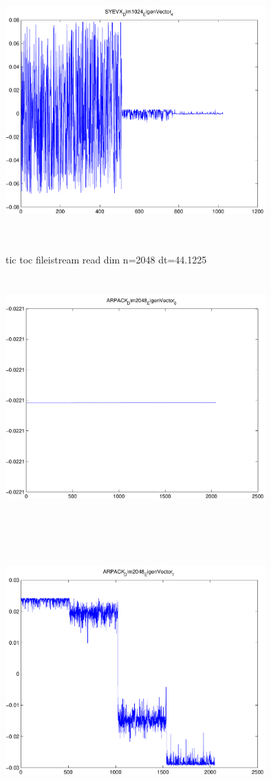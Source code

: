 \documentclass[9pt]{article}
\theoremstyle{plain}
\theoremstyle{definition}
\theoremstyle{remark}
\numberwithin{equation}{section}
\begin{document}
\includegraphics[width=10.0cm,height=10.0cm]{SYEVX_Dim1024_EigenVector_4.pdf}

tic toc fileistream read dim n=2048 dt=44.1225
\includegraphics[width=10.0cm,height=10.0cm]{ARPACK_Dim2048_EigenVector_0.pdf}

\includegraphics[width=10.0cm,height=10.0cm]{ARPACK_Dim2048_EigenVector_1.pdf}
\end{document}

